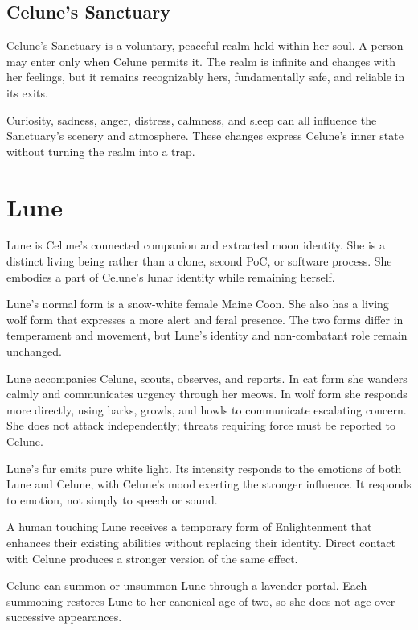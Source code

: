 \documentclass[10pt]{article}
\begin{document}
\hypertarget{celunes-sanctuary}{%
\subsection{Celune's Sanctuary}\label{celunes-sanctuary}}

Celune's Sanctuary is a voluntary, peaceful realm held within her soul. A person may enter only when Celune permits it. The realm is infinite and changes with her feelings, but it remains recognizably hers, fundamentally safe, and reliable in its exits.

Curiosity, sadness, anger, distress, calmness, and sleep can all influence the Sanctuary's scenery and atmosphere. These changes express Celune's inner state without turning the realm into a trap.

\hypertarget{lune}{%
\section{Lune}\label{lune}}

Lune is Celune's connected companion and extracted moon identity. She is a distinct living being rather than a clone, second PoC, or software process. She embodies a part of Celune's lunar identity while remaining herself.

Lune's normal form is a snow-white female Maine Coon. She also has a living wolf form that expresses a more alert and feral presence. The two forms differ in temperament and movement, but Lune's identity and non-combatant role remain unchanged.

Lune accompanies Celune, scouts, observes, and reports. In cat form she wanders calmly and communicates urgency through her meows. In wolf form she responds more directly, using barks, growls, and howls to communicate escalating concern. She does not attack independently; threats requiring force must be reported to Celune.

Lune's fur emits pure white light. Its intensity responds to the emotions of both Lune and Celune, with Celune's mood exerting the stronger influence. It responds to emotion, not simply to speech or sound.

A human touching Lune receives a temporary form of Enlightenment that enhances their existing abilities without replacing their identity. Direct contact with Celune produces a stronger version of the same effect.

Celune can summon or unsummon Lune through a lavender portal. Each summoning restores Lune to her canonical age of two, so she does not age over successive appearances.
\end{document}
